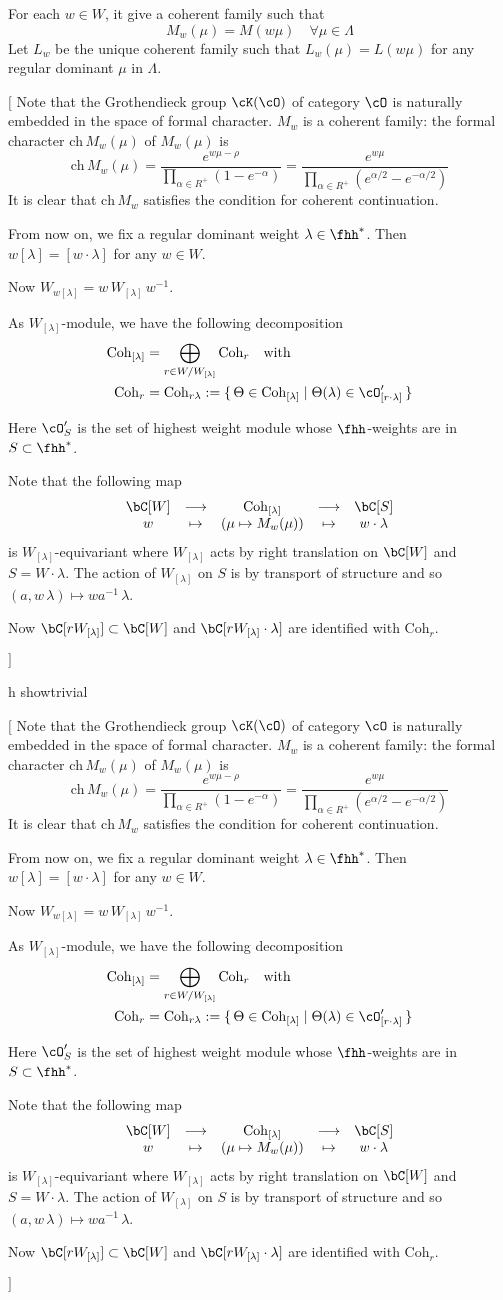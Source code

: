\documentclass[12pt,a4paper]{amsart}
\newcommand{\trivial}[2][]{\if\relax\detokenize{#1}\relax
  {%
      \color{orange} \vspace{0em} $[$  #2 $]$
      \color{black}
  }
  \else
\ifx#1h
\ifcsname showtrivial\endcsname
{%
    \color{orange} \vspace{0em}  $[$ #2 $]$
    \color{black}
}
\fi
\else {\red Wrong argument!} \fi
\fi
}
\numberwithin{equation}{section}
\theoremstyle{remark}
\DeclareMathOperator{\sspan}{span}
\def\ch{\mathrm{ch}\,}
\def\Coh{\mathrm{Coh}}
\begin{document}
For each $w\in W$, it give a coherent family such that
\[
M_w(\mu) = M(w\mu) \quad \forall \mu \in \Lambda %
\]
Let $L_w$ be the unique coherent family such that $L_w(\mu) = L(w\mu)$ for any
regular dominant $\mu$ in $\Lambda$.
\trivial{Note that the Grothendieck group
  $\cK(\cO)$ of category $\cO$ is naturally embedded in the space of formal
  character. $M_w$ is a coherent family: the formal character $\ch M_w (\mu)$ of
  $M_w(\mu)$ is
  \[
    \ch M_{w}(\mu)=\frac{e^{w\mu-\rho}}{\prod_{\alpha\in R^+} (1-e^{-\alpha})}
    =\frac{e^{w\mu}}{\prod_{\alpha\in R^+} (e^{\alpha/2}-e^{-\alpha/2})}
  \]
  It is clear
  that $\ch M_w$ satisfies the condition for coherent continuation.

  From now on, we fix a regular dominant weight $\lambda \in \fhh^{*}$.
  Then $w[\lambda] = [w\cdot \lambda]$ for any $w\in W$.

 Now $W_{w[\lambda]} = w\, W_{[\lambda]}\, w^{-1}$.

 As $W_{[\lambda]}$-module, we have the following decomposition
 \[
   \begin{split}
     \Coh_{[\lambda]} &= \bigoplus_{r\in W/W_{[\lambda]}}
     \Coh_{r}\quad \text{with}\\
     \Coh_{r} &=\Coh_{r\lambda} := \set{\cof\in \Coh_{[\lambda]}| \cof(\lambda)\in \cO'_{[r\cdot \lambda]}}
   \end{split}
 \]

 Here $\cO'_{S}$ is the set of highest weight module whose $\fhh$-weights are in
 $S\subset \fhh^{*}$.


 Note that the following map
 \[
   \begin{array}{ccccc}
     \bC[W] & \longrightarrow & \Coh_{[\lambda]} &\longrightarrow & \bC[S]\\
     w & \mapsto & (\mu\mapsto M_{w}(\mu)) & \mapsto & w\cdot \lambda
   \end{array}
 \]
 is $W_{[\lambda]}$-equivariant
 where $W_{[\lambda]}$ acts by right translation on $\bC[W]$ and $S = W\cdot \lambda$.
 The action of $W_{[\lambda]}$ on $S$ is by transport of structure and so
 $(a, w\,\lambda)\mapsto wa^{-1}\,  \lambda$.

 Now $\bC[r W_{[\lambda]}] \subset \bC[W]$ and
 $\bC[r W_{[\lambda]}\cdot \lambda]$
 are identified with $\Coh_{r}$.


}
\end{document}
